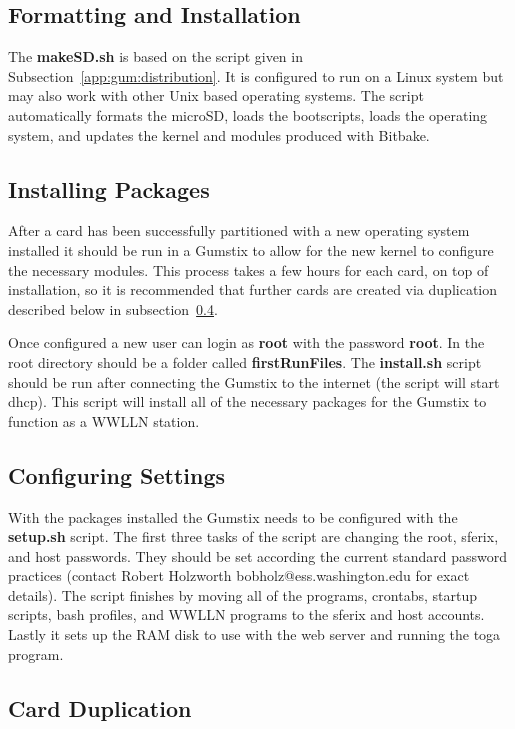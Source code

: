 \subsection{Formatting and Installation}

The {\bf makeSD.sh} is based on the script given in Subsection~\ref{app:gum:distribution}.
It is configured to run on a Linux system but may also work with other Unix based operating systems.
The script automatically formats the microSD, loads the bootscripts, loads the operating system, and updates the kernel and modules produced with Bitbake.

\subsection{Installing Packages}

After a card has been successfully partitioned with a new operating system installed it should be run in a Gumstix to allow for the new kernel to configure the necessary modules.
This process takes a few hours for each card, on top of installation, so it is recommended that further cards are created via duplication described below in subsection~\ref{app:gumstix:duplication}.

Once configured a new user can login as {\bf root} with the password {\bf root}.
In the root directory should be a folder called {\bf firstRunFiles}.
The {\bf install.sh} script should be run after connecting the Gumstix to the internet (the script will start dhcp).
This script will install all of the necessary packages for the Gumstix to function as a WWLLN station.

\subsection{Configuring Settings}

With the packages installed the Gumstix needs to be configured with the {\bf setup.sh} script.
The first three tasks of the script are changing the root, sferix, and host passwords.
They should be set according the current standard password practices (contact Robert Holzworth bobholz@ess.washington.edu for exact details).
The script finishes by moving all of the programs, crontabs, startup scripts, bash profiles, and WWLLN programs to the sferix and host accounts.
Lastly it sets up the RAM disk to use with the web server and running the toga program.

\subsection{Card Duplication}
\label{app:gumstix:duplication}

